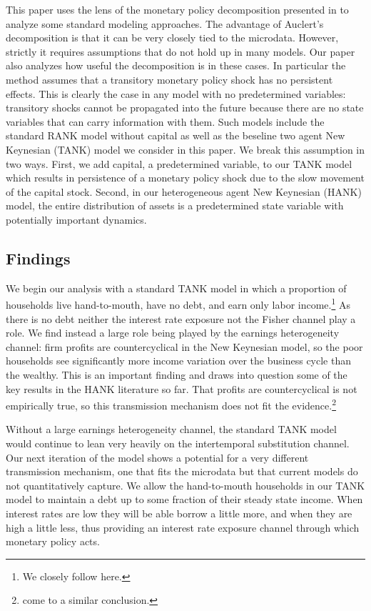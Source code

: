 \documentclass[12pt,a4paper]{article}
\begin{document}
This paper uses the lens of the monetary policy decomposition presented in \cite{auclert_monetary_2017} to analyze some standard modeling approaches. The advantage of Auclert's decomposition is that it can be very closely tied to the microdata.  However, strictly it requires assumptions that do not hold up in many models. Our paper also analyzes how useful the decomposition is in these cases. In particular the method assumes that a transitory monetary policy shock has no persistent effects.  This is clearly the case in any model with no predetermined variables: transitory shocks cannot be propagated into the future because there are no state variables that can carry information with them. Such models include the standard RANK model without capital as well as the beseline two agent New Keynesian (TANK) model we consider in this paper. We break this assumption in two ways. First, we add capital, a predetermined variable, to our TANK model which results in persistence of a monetary policy shock due to the slow movement of the capital stock. Second, in our heterogeneous agent New Keynesian (HANK) model, the entire distribution of assets is a predetermined state variable with potentially important dynamics.

\subsection{Findings}
We begin our analysis with a standard TANK model in which a proportion of households live hand-to-mouth, have no debt, and earn only labor income.\footnote{We closely follow \cite{dgHANKTANK} here.} As there is no debt neither the interest rate exposure not the Fisher channel play a role. We find instead a large role being played by the earnings heterogeneity channel: firm profits are countercyclical in the New Keynesian model, so the poor households see significantly more income variation over the business cycle than the wealthy. This is an important finding and draws into question some of the key results in the HANK literature so far. That profits are countercyclical is not empirically true, so this transmission mechanism does not fit the evidence.\footnote{\cite{broer_2018} come to a similar conclusion.}

Without a large earnings heterogeneity channel, the standard TANK model would continue to lean very heavily on the intertemporal substitution channel. Our next iteration of the model shows a potential for a very different transmission mechanism, one that fits the microdata but that current models do not quantitatively capture. We allow the hand-to-mouth households in our TANK model to maintain a debt up to some fraction of their steady state income. When interest rates are low they will be able borrow a little more, and when they are high a little less, thus providing an interest rate exposure channel through which monetary policy acts.
\end{document}
